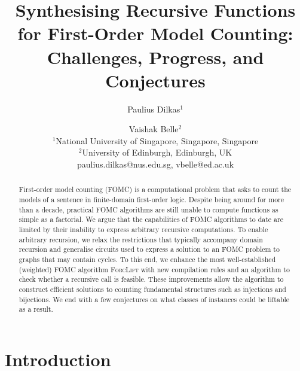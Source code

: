\documentclass{article}
\title{Synthesising Recursive Functions for First-Order Model Counting:\\
  Challenges, Progress, and Conjectures}
\author{%
Paulius Dilkas$^1$\and
Vaishak Belle$^2$\\
\affiliations
$^1$National University of Singapore, Singapore, Singapore\\
$^2$University of Edinburgh, Edinburgh, UK\\
\emails
paulius.dilkas@nus.edu.sg,
vbelle@ed.ac.uk
}
\theoremstyle{definition}
\theoremstyle{remark}
\begin{document}
\maketitle

\begin{abstract}
  First-order model counting (FOMC) is a computational problem that asks to
  count the models of a sentence in finite-domain first-order logic. Despite
  being around for more than a decade, practical FOMC algorithms are still
  unable to compute functions as simple as a factorial. We argue that the
  capabilities of FOMC algorithms to date are limited by their inability to
  express arbitrary recursive computations. To enable arbitrary recursion, we
  relax the restrictions that typically accompany domain recursion and
  generalise circuits used to express a solution to an FOMC problem to graphs
  that may contain cycles. To this end, we enhance the most well-established
  (weighted) FOMC algorithm \textsc{ForcLift} with new compilation rules and an
  algorithm to check whether a recursive call is feasible. These improvements
  allow the algorithm to construct efficient solutions to counting fundamental
  structures such as injections and bijections. We end with a few conjectures on
  what classes of instances could be liftable as a result.
\end{abstract}


\section{Introduction}\label{sec:introduction}



\end{document}
